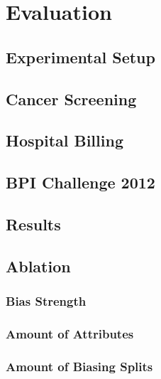%
\chapter{Evaluation}

\section{Experimental Setup}

\section{Cancer Screening}

\section{Hospital Billing}

\section{BPI Challenge 2012}

\section{Results}

\section{Ablation}

\subsection{Bias Strength}

\subsection{Amount of Attributes}

\subsection{Amount of Biasing Splits}
